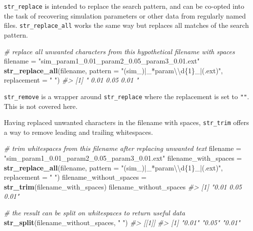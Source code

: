 \documentclass[]{book}
\newenvironment{Shaded}{}{}
\newcommand{\CharTok}[1]{\textcolor[rgb]{0.25,0.44,0.63}{#1}}
\newcommand{\CommentTok}[1]{\textcolor[rgb]{0.38,0.63,0.69}{\textit{#1}}}
\newcommand{\DataTypeTok}[1]{\textcolor[rgb]{0.56,0.13,0.00}{#1}}
\newcommand{\KeywordTok}[1]{\textcolor[rgb]{0.00,0.44,0.13}{\textbf{#1}}}
\newcommand{\NormalTok}[1]{#1}
\newcommand{\StringTok}[1]{\textcolor[rgb]{0.25,0.44,0.63}{#1}}
\begin{document}
\texttt{str\_replace} is intended to replace the search pattern, and can be co-opted into the task of recovering simulation parameters or other data from regularly named files. \texttt{str\_replace\_all} works the same way but replaces all matches of the search pattern.

\begin{Shaded}
\begin{Highlighting}[]
\CommentTok{# replace all unwanted characters from this hypothetical filename with spaces}
\NormalTok{filename =}\StringTok{ "sim_param1_0.01_param2_0.05_param3_0.01.ext"}
\KeywordTok{str_replace_all}\NormalTok{(filename,}
                \DataTypeTok{pattern =} \StringTok{"(sim_)|_*param}\CharTok{\textbackslash{}\textbackslash{}}\StringTok{d\{1\}_|(.ext)"}\NormalTok{,}
                \DataTypeTok{replacement =} \StringTok{" "}\NormalTok{)}
\CommentTok{#> [1] "  0.01 0.05 0.01 "}
\end{Highlighting}
\end{Shaded}

\texttt{str\_remove} is a wrapper around \texttt{str\_replace} where the replacement is set to \texttt{""}. This is not covered here.

Having replaced unwanted characters in the filename with spaces, \texttt{str\_trim} offers a way to remove leading and trailing whitespaces.

\begin{Shaded}
\begin{Highlighting}[]
\CommentTok{# trim whitespaces from this filename after replacing unwanted text}
\NormalTok{filename =}\StringTok{ "sim_param1_0.01_param2_0.05_param3_0.01.ext"}
\NormalTok{filename_with_spaces =}\StringTok{ }\KeywordTok{str_replace_all}\NormalTok{(filename,}
                                       \DataTypeTok{pattern =} \StringTok{"(sim_)|_*param}\CharTok{\textbackslash{}\textbackslash{}}\StringTok{d\{1\}_|(.ext)"}\NormalTok{,}
                                       \DataTypeTok{replacement =} \StringTok{" "}\NormalTok{)}
\NormalTok{filename_without_spaces =}\StringTok{ }\KeywordTok{str_trim}\NormalTok{(filename_with_spaces)}
\NormalTok{filename_without_spaces}
\CommentTok{#> [1] "0.01 0.05 0.01"}

\CommentTok{# the result can be split on whitespaces to return useful data}
\KeywordTok{str_split}\NormalTok{(filename_without_spaces, }\StringTok{" "}\NormalTok{)}
\CommentTok{#> [[1]]}
\CommentTok{#> [1] "0.01" "0.05" "0.01"}
\end{Highlighting}
\end{Shaded}
\end{document}
